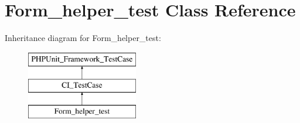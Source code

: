 \hypertarget{class_form__helper__test}{}\section{Form\+\_\+helper\+\_\+test Class Reference}
\label{class_form__helper__test}
Inheritance diagram for Form\+\_\+helper\+\_\+test\+:\begin{figure}[H]
\begin{center}
\leavevmode
\includegraphics[height=3.000000cm]{class_form__helper__test}
\end{center}
\end{figure}
